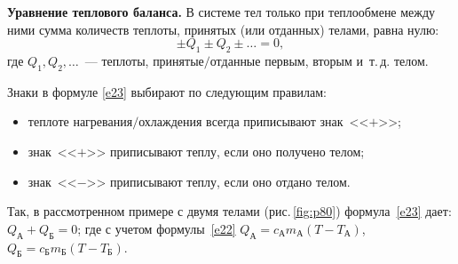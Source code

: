 \documentclass[main.tex]{subfiles}
\begin{document}
%
\begin{law}
    \textbf{Уравнение теплового баланса.} В системе тел только при теплообмене между ними сумма количеств теплоты, принятых (или отданных) телами, равна нулю:
    \begin{equation}
        \label{e23}
        \pm Q_1\pm Q_2\pm\ldots=0,
    \end{equation}
    где $Q_1,Q_2,\ldots$~--- теплоты, принятые$/$отданные первым, вторым и~т.\,д. телом.
\end{law}
%
Знаки в формуле \eqref{e23} выбирают по следующим правилам:
\begin{itemize}
    \item теплоте нагревания$/$охлаждения всегда приписывают знак~<<$+$>>; 
    \item знак~<<$+$>> приписывают теплу, если оно получено телом;
    \item знак~<<$-$>> приписывают теплу, если оно отдано телом.
\end{itemize}

Так, в рассмотренном примере с двумя телами (рис.\,\ref{fig:p80}) формула~\eqref{e23} дает:
$Q_\text{А}+Q_\text{Б}=0$; где с учетом формулы~\eqref{e22} $Q_\text{А}=c_\text{А}m_\text{А}(T-T_\text{А})$, $Q_\text{Б}=c_\text{Б}m_\text{Б}(T-T_\text{Б})$.




 
\end{document}
